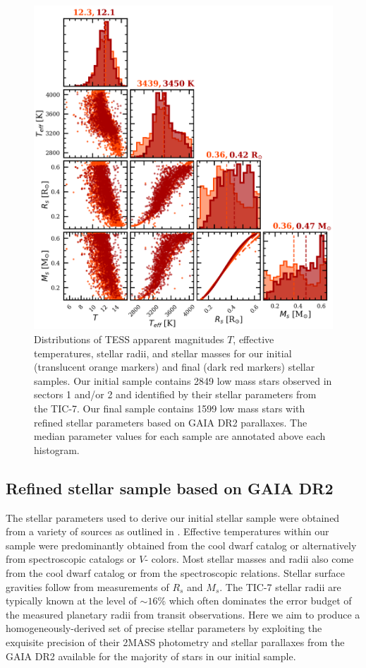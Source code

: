 \begin{figure}
  \centering
  \includegraphics[width=0.6\hsize]{figures/stellar_corner.png}
  \caption[Stellar parameters for M dwarf TICs in TESS sectors 1 and 2.]
    {Distributions of TESS apparent magnitudes $T$, effective temperatures,
    stellar radii, and stellar masses for our initial (translucent orange markers) and final
    (dark red markers) stellar samples. Our initial sample contains 2849 low mass stars observed in
    sectors 1 and/or 2 and identified by their stellar parameters from the TIC-7. Our final sample contains
    1599 low mass stars with refined stellar parameters based on GAIA
    DR2 parallaxes. The median parameter values for each sample are annotated above each histogram.}
  \label{fig:stars}
\end{figure}
  

\subsection{Refined stellar sample based on GAIA DR2} \label{sect:gaia}
The stellar parameters used to derive our initial stellar sample were obtained from a variety of sources
as outlined in \cite{stassun17}. Effective temperatures within our sample were predominantly obtained
from the cool dwarf catalog \citep{muirhead18} or alternatively from spectroscopic catalogs or $V$-\Ks{}
colors.
Most stellar masses and radii also come from the cool dwarf catalog or from the \cite{torres10}
spectroscopic relations. Stellar surface gravities follow from measurements of $R_s$ and $M_s$.
The TIC-7 stellar radii are typically known at the level of $\sim 16$\% which often dominates
the error budget of the measured planetary radii from transit observations. Here we aim to produce a
homogeneously-derived set of precise stellar parameters by exploiting the exquisite precision of their
2MASS photometry and stellar parallaxes from the GAIA DR2 \cite{gaia18} available for the majority of
stars in our initial sample.

